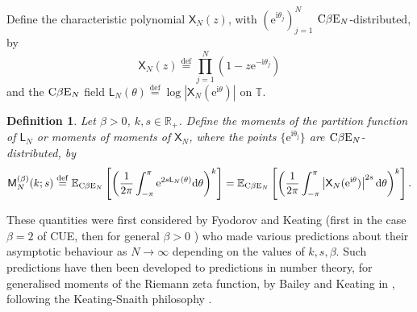 \documentclass[]{article}
\newtheorem{defn}[thm]{Definition}
\begin{document}
Define the characteristic polynomial $\mathsf{X}_N(z)$, with $(\mathrm{e}^{\mathrm{i}\theta_j})_{j=1}^N$ $\textnormal{C}\beta \textnormal{E}_N$-distributed, by
\begin{equation*}
\mathsf{X}_N(z)\overset{\mathrm{def}}{=}\prod_{j=1}^N\left(1-z\mathrm{e}^{-\mathrm{i}\theta_j}\right)
\end{equation*}
and the  $\textnormal{C}\beta \textnormal{E}_N$ field $\mathsf{L}_N(\theta)\overset{\mathrm{def}}= \log |\mathsf{X}_N(\mathrm{e}^{\mathrm{i}\theta})|$ on $\mathbb{T}$. 

\begin{defn}
Let $\beta>0$, $k, s \in \mathbb{R}_+$. Define the moments of the partition function of $\mathsf{L}_N$ or moments of moments of $\mathsf{X}_N$, where the points $\{\mathrm{e}^{\mathrm{i\theta_j}}\}$  are $\textnormal{C}\beta \textnormal{E}_N$-distributed, by 
\begin{equation*}
\mathsf{M}^{(\beta)}_N(k;s)\overset{\mathrm{def}}{=}\mathbb{E}_{\textnormal{C}\beta \textnormal{E}_N}\left[\left(\frac{1}{2\pi}\int_{-\pi}^\pi\mathrm{e}^{2s\mathsf{L}_N(\theta)}\mathrm{d}\theta\right)^{k}\right]= \mathbb{E}_{\textnormal{C}\beta \textnormal{E}_N}\left[\left(\frac{1}{2\pi}\int_{-\pi}^\pi\left|\mathsf{X}_N(\mathrm{e}^{\mathrm{i}\theta})\right|^{2s}\mathrm{d}\theta\right)^{k}\right].
\end{equation*} 
\end{defn}
These quantities were first considered by Fyodorov and Keating \cite{FyodorovKeating} (first in the case $\beta=2$ of CUE, then for general $\beta>0$ \cite{FyodorovGnutzmannKeating,KeatingWong}) who made various predictions about their asymptotic behaviour as $N \to \infty$ depending on the values of $k, s, \beta$. Such predictions have then been developed to predictions in number theory, for generalised moments of the Riemann zeta function, by Bailey and Keating in \cite{BaileyKeatingZeta}, following the Keating-Snaith philosophy \cite{KeatingSnaith,KeatingSnaithSympOrth}.
\end{document}

